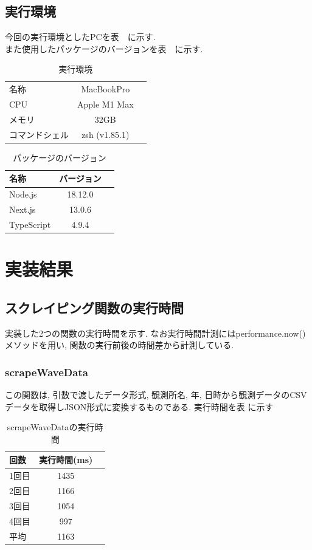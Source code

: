 \subsection{実行環境}
今回の実行環境としたPCを表　に示す.\\
また使用したパッケージのバージョンを表　に示す.

\begin{table}[hbtp]
	\caption{実行環境}
	\label{table:data_type}
	\centering
	\begin{tabular}{lcr}
		\hline
		名称      & MacBookPro    \\
		CPU     & Apple M1 Max  \\
		メモリ     & 32GB          \\
		コマンドシェル & zsh (v1.85.1) \\
		\hline
	\end{tabular}
\end{table}

\begin{table}[hbtp]
	\caption{パッケージのバージョン}
	\label{table:data_type}
	\centering
	\begin{tabular}{lcr}
		\hline
		名称         & バージョン   \\
		\hline \hline
		Node.js    & 18.12.0 \\
		Next.js    & 13.0.6  \\
		TypeScript & 4.9.4   \\
		
		\hline
	\end{tabular}
\end{table}


\section{実装結果}
\subsection{スクレイピング関数の実行時間}
実装した2つの関数の実行時間を示す.
なお実行時間計測にはperformance.now()メソッドを用い, 関数の実行前後の時間差から計測している.

\subsubsection{scrapeWaveData}
この関数は, 引数で渡したデータ形式, 観測所名, 年, 日時から観測データのCSVデータを取得しJSON形式に変換するものである.
実行時間を表 に示す

\begin{table}[hbtp]
	\caption{scrapeWaveDataの実行時間}
	\label{table:data_type}
	\centering
	\begin{tabular}{lcr}
		\hline
		回数  & 実行時間(ms) \\
		\hline \hline
		1回目 & 1435     \\
		2回目 & 1166     \\
		3回目 & 1054     \\
		4回目 & 997      \\
		\hline
		平均  & 1163
	\end{tabular}
\end{table}


